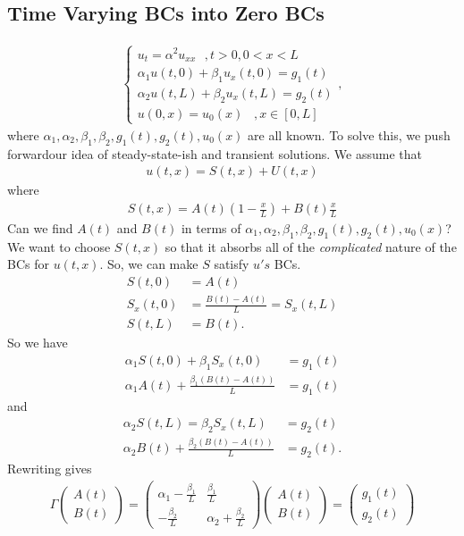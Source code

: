 \documentclass{article}
\theoremstyle{definition}
\begin{document}
\subsection{Time Varying BCs into Zero BCs}
\begin{align*}
\begin{cases}
u_t = \alpha^2u_{xx}\,\,\,\,, t>0,0<x<L\\
\alpha_1 u(t,0) + \beta_1 u_x(t,0) = g_1(t)\\
\alpha_2 u(t,L) + \beta_2 u_x(t,L) = g_2(t)\\
u(0,x) = u_0(x)\,\,\,\,\,, x\in[0,L]
\end{cases},
\end{align*}
where $\alpha_1,\alpha_2,\beta_1,\beta_2,g_1(t),g_2(t),u_0(x)$ are all known. To solve this, we push forwardour idea of steady-state-ish and transient solutions. We assume that 
\begin{align*}
u(t,x)= S(t,x) + U(t,x)
\end{align*}
where
\begin{align*}
S(t,x) = A(t)\left( 1 - \frac{x}{L}\right) + B(t)\frac{x}{L}
\end{align*}
Can we find $A(t)$ and $B(t)$ in terms of $\alpha_1,\alpha_2,\beta_1,\beta_2,g_1(t),g_2(t),u_0(x)$? We want to choose $S(t,x)$ so that it absorbs all of the \textit{complicated} nature of the BCs for $u(t,x)$. So, we can make $S$ satisfy $u's$ BCs. 
\begin{align*}
S(t,0)&= A(t)\\
S_x(t,0) &= \frac{B(t) - A(t)}{L}  = S_x(t,L)\\
S(t,L) &= B(t).
\end{align*}
So we have
\begin{align*}
\alpha_1 S(t,0) + \beta_1 S_x(t,0) &= g_1(t)\\
\alpha_1 A(t) + \frac{\beta_1(B(t) - A(t))}{L} &= g_1(t)
\end{align*}
and
\begin{align*}
\alpha_2 S(t,L) = \beta_2 S_x(t,L) &= g_2(t)\\
\alpha_2 B(t) + \frac{\beta_2(B(t) - A(t))}{L} &= g_2(t).
\end{align*}
Rewriting gives
\begin{align*}
\Gamma\begin{pmatrix}
A(t)\\B(t)
\end{pmatrix} = 
\begin{pmatrix}
\alpha_1 - \frac{\beta_1}{L} & \frac{\beta_1}{L}\\
- \frac{\beta_2}{L} & \alpha_2  + \frac{\beta_2}{L}
\end{pmatrix}
\begin{pmatrix}
A(t)\\B(t)
\end{pmatrix}
=
\begin{pmatrix}
g_1(t)\\g_2(t)
\end{pmatrix}
\end{align*}
\end{document}
